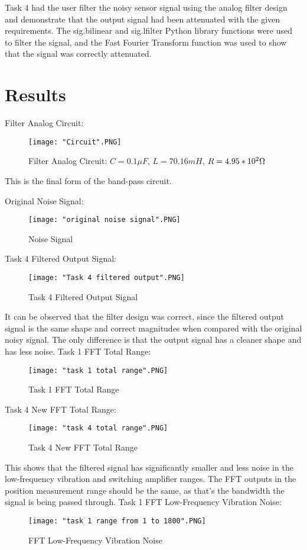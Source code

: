 \documentclass[12pt]{article}
\begin{document}
Task 4 had the user filter the noisy sensor signal using the analog filter design and demonstrate that the output signal had been attenuated with the given requirements. The sig.bilinear and sig.lfilter Python library functions were used to filter the signal, and the Fast Fourier Transform function was used to show that the signal was correctly attenuated.\clearpage
\section{Results}
Filter Analog Circuit:
\begin{figure}[H]
\texttt{[image: "Circuit".PNG]}
  \caption{Filter Analog Circuit: $C = 0.1\mu F$, $L = 70.16mH$, $R = 4.95*10^2 \ohm$}
  \end{figure}
This is the final form of the band-pass circuit. 
 
Original Noise Signal:
\begin{figure}[H]
\texttt{[image: "original noise signal".PNG]}
  \caption{Noise Signal}
  \end{figure}

Task 4 Filtered Output Signal:
\begin{figure}[H]
\centering
\texttt{[image: "Task 4 filtered output".PNG]}
  \caption{Task 4 Filtered Output Signal}
  \end{figure}
  It can be observed that the filter design was correct, since the filtered output signal is the same shape and correct magnitudes when compared with the original noisy signal. The only difference is that the output signal has a cleaner shape and has less noise.
  \clearpage
Task 1 FFT Total Range:
\begin{figure}[H]
\texttt{[image: "task 1 total range".PNG]}
  \caption{Task 1 FFT Total Range}
  \end{figure}
  
  Task 4 New FFT Total Range:
\begin{figure}[H]
\texttt{[image: "task 4 total range".PNG]}
  \caption{Task 4 New FFT Total Range}
  \end{figure}
This shows that the filtered signal has significantly smaller and less noise in the low-frequency vibration and switching amplifier ranges. The FFT outputs in the position measurement range should be the same, as that's the bandwidth the signal is being passed through.
\clearpage  
Task 1 FFT Low-Frequency Vibration Noise:
\begin{figure}[H]
\texttt{[image: "task 1 range from 1 to 1800".PNG]}
  \caption{FFT Low-Frequency Vibration Noise}
  \end{figure}
  
\end{document}
